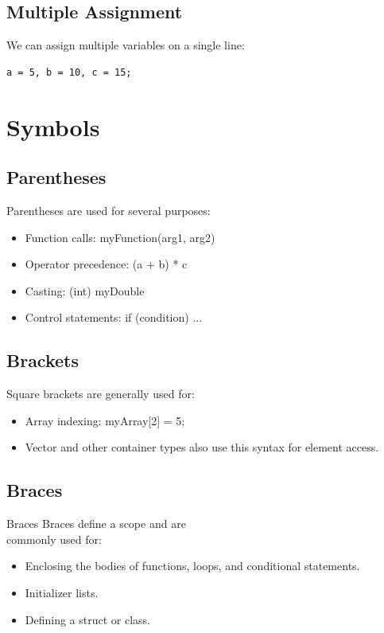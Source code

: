 \documentclass{report}
\begin{document}
    \subsection{Multiple Assignment}
    \bigbreak \noindent 
    We can assign multiple variables on a single line:
    \bigbreak \noindent 
    \sepline
    \begin{verbatim}
a = 5, b = 10, c = 15;
    \end{verbatim}
    \sepline

    \pagebreak \bigbreak \noindent 
    \section{\LARGE Symbols}
    \bigbreak \noindent 
    \begin{minipage}[t]{0.47\textwidth}
        \subsection{Parentheses}
        \bigbreak \noindent 
        Parentheses are used for several purposes:
        \begin{itemize}
            \item Function calls: myFunction(arg1, arg2)
            \item Operator precedence: (a + b) * c
            \item Casting: (int) myDouble
            \item Control statements: if (condition) { ... }
        \end{itemize}
    \end{minipage}
    \begin{minipage}[t]{0.47\textwidth}
    \subsection{Brackets}
    \bigbreak \noindent 
    Square brackets are generally used for:
    \begin{itemize}
        \item Array indexing: myArray[2] = 5;
        \item Vector and other container types also use this syntax for element access.
    \end{itemize}
    \end{minipage}
    \bigbreak \noindent \bigbreak \noindent 
    \begin{minipage}[t]{0.47\textwidth}
    \subsection{Braces}
    \bigbreak \noindent 
    Braces Braces define a scope and are \\ commonly used for:
    \begin{itemize}
        \item Enclosing the bodies of functions, loops, and conditional statements.
        \item Initializer lists.
        \item Defining a struct or class.
    \end{itemize}
    \end{minipage}
\end{document}
